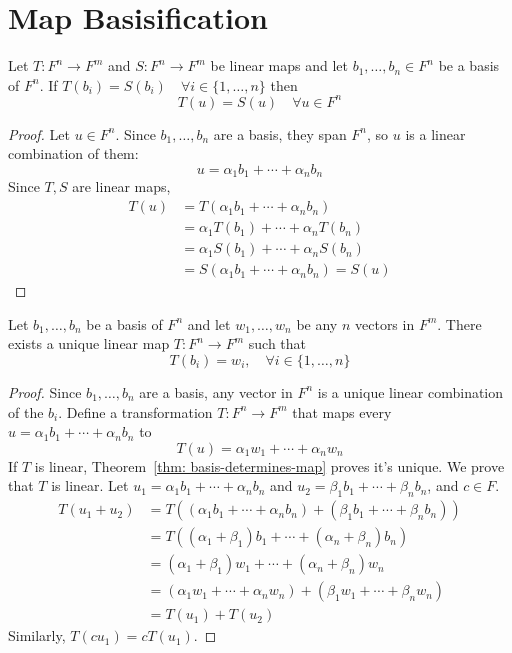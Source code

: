  \section{Map Basisification}

\begin{theorem}\label{thm:
basis-determines-map} Let $T: F^n \to F^m$ and $S: F^n \to F^m$ be linear maps
and let $b_1, \ldots, b_n \in F^n$ be a basis of $F^n$. If $ T(b_i) = S(b_i)
\quad \forall i \in \{1, \ldots, n\} $ then \[ T(u) = S(u) \quad \forall u \in
F^n \] \end{theorem}

\begin{proof} Let $u \in F^n$. Since $b_1, \ldots, b_n$ are a basis, they span
$F^n$, so $u$ is a linear combination of them: \[ u = \alpha_1 b_1 + \cdots +
\alpha_n b_n \] Since $T, S$ are linear maps, \begin{align*} T(u) &= T(\alpha_1
b_1 + \cdots + \alpha_n b_n) \\ &= \alpha_1 T(b_1) + \cdots + \alpha_n T(b_n) \\
&= \alpha_1 S(b_1) + \cdots + \alpha_n S(b_n) \\ &= S(\alpha_1 b_1 + \cdots +
\alpha_n b_n) = S(u) \end{align*} \end{proof}

\begin{theorem}\label{thm:
basis-makes-map} Let $b_1, \ldots, b_n$ be a basis of $F^n$ and let $w_1, \ldots,
w_n$ be any $n$ vectors in $F^m$. There exists a unique linear map $T: F^n \to
F^m$ such that \[ T(b_i) = w_i, \quad \forall i \in \{1, \ldots, n\} \]
\end{theorem}

\begin{proof} Since $b_1, \ldots, b_n$ are a basis, any vector in $F^n$ is a
unique linear combination of the $b_i$. Define a transformation $T: F^n \to F^m$
that maps every $u = \alpha_1 b_1 + \cdots + \alpha_n b_n$ to \[ T(u) = \alpha_1
w_1 + \cdots + \alpha_n w_n \] If $T$ is linear, Theorem~\ref{thm:
basis-determines-map} proves it's unique. We prove that $T$ is linear. Let $u_1
= \alpha_1 b_1 + \cdots + \alpha_n b_n$ and $u_2 = \beta_1 b_1 + \cdots +
\beta_n b_n$, and $c \in F$. \begin{align*} T(u_1 + u_2) &= T((\alpha_1 b_1 +
\cdots + \alpha_n b_n) + (\beta_1 b_1 + \cdots + \beta_n b_n)) \\ &= T((\alpha_1
+ \beta_1)b_1 + \cdots + (\alpha_n + \beta_n)b_n) \\ &= (\alpha_1 + \beta_1)w_1
+ \cdots + (\alpha_n + \beta_n)w_n \\ &= (\alpha_1 w_1 + \cdots + \alpha_n w_n)
+ (\beta_1 w_1 + \cdots + \beta_n w_n) \\ &= T(u_1) + T(u_2) \end{align*}
Similarly, $T(cu_1) = cT(u_1)$. \end{proof}

